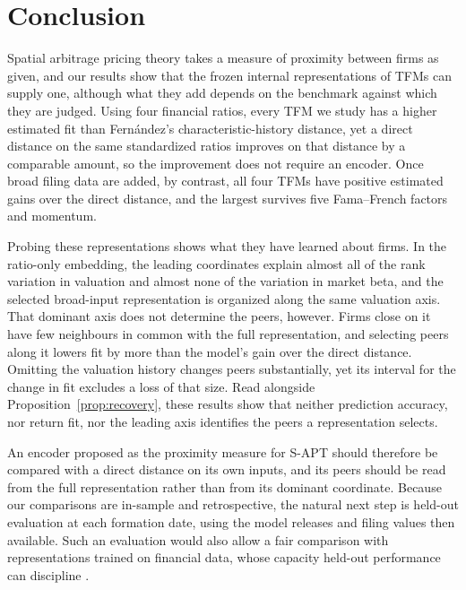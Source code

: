 \section{Conclusion}

Spatial arbitrage pricing theory takes a measure of proximity between firms
as given, and our results show that the frozen internal representations of
TFMs can supply one, although what they add depends on the benchmark
against which they are judged. Using four financial ratios, every TFM we
study has a higher estimated fit than Fern\'andez's characteristic-history
distance, yet a direct distance on the same standardized ratios improves
on that distance by a comparable amount, so the improvement does not
require an encoder. Once broad filing data are added, by contrast, all four
TFMs have positive estimated gains over the direct distance, and the
largest survives five Fama--French factors and momentum.

Probing these representations shows what they have learned about firms.
In the ratio-only embedding, the leading coordinates explain almost all of
the rank variation in valuation and almost none of the variation in market
beta, and the selected broad-input representation is organized along the
same valuation axis. That dominant axis does not determine the peers,
however. Firms close on it have few neighbours in common with the full
representation, and selecting peers along it lowers fit by more than the
model's gain over the direct distance. Omitting the valuation history
changes peers substantially, yet its interval for the change in fit
excludes a loss of that size. Read alongside
Proposition~\ref{prop:recovery}, these results show that neither
prediction accuracy, nor return fit, nor the leading axis identifies the
peers a representation selects.

An encoder proposed as the proximity measure for S-APT should therefore be
compared with a direct distance on its own inputs, and its peers should be
read from the full representation rather than from its dominant
coordinate. Because our comparisons are in-sample and retrospective, the
natural next step is held-out evaluation at each formation date, using the
model releases and filing values then available. Such an evaluation would
also allow a fair comparison with representations trained on financial
data, whose capacity held-out performance can discipline
\citep{kelly2024virtue}.
